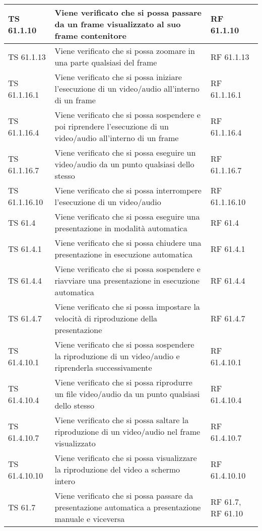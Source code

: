 {{\begin{longtable} [c]{| p{3cm} | p{6cm} |p{3cm}|}
			\hline
			TS 61.1.10 & Viene verificato che si possa passare da un frame\ped{g} visualizzato al suo frame\ped{g} contenitore & RF 61.1.10\\
			\hline
			TS 61.1.13 & Viene verificato che si possa zoomare in una parte qualsiasi del frame\ped{g} & RF 61.1.13\\
			\hline
			TS 61.1.16.1 & Viene verificato che si possa iniziare l’esecuzione di un video/audio all'interno di un frame\ped{g} & RF 61.1.16.1\\
			\hline
			TS 61.1.16.4 & Viene verificato che si possa sospendere\ped{g} e poi riprendere l'esecuzione di un video/audio all'interno di un frame\ped{g} & RF 61.1.16.4\\
			\hline
			TS 61.1.16.7 & Viene verificato che si possa eseguire un video/audio da un punto qualsiasi dello stesso & RF 61.1.16.7\\
			\hline
			TS 61.1.16.10 & Viene verificato che si possa interrompere l'esecuzione di un video/audio & RF 61.1.16.10\\
			\hline
			TS 61.4 & Viene verificato che si possa eseguire una presentazione in modalità automatica & RF 61.4\\
			\hline
			TS 61.4.1 & Viene verificato che si possa chiudere una presentazione in esecuzione automatica & RF 61.4.1\\
			\hline
			TS 61.4.4 & Viene verificato che si possa sospendere\ped{g} e riavviare una presentazione in esecuzione automatica & RF 61.4.4\\
			\hline
			TS 61.4.7 & Viene verificato che si possa impostare la velocità di riproduzione della presentazione & RF 61.4.7\\
			\hline
			TS 61.4.10.1 & Viene verificato che si possa sospendere la riproduzione di un video/audio e riprenderla successivamente & RF 61.4.10.1\\
			\hline
			TS 61.4.10.4 & Viene verificato che si possa riprodurre un file video/audio da un punto qualsiasi dello stesso & RF 61.4.10.4\\
			\hline
			TS 61.4.10.7 & Viene verificato che si possa saltare la riproduzione di un video/audio nel frame\ped{g} visualizzato & RF 61.4.10.7\\
			\hline
			TS 61.4.10.10 & Viene verificato che si possa visualizzare la riproduzione del video a schermo intero & RF 61.4.10.10\\
			\hline
			TS 61.7 & Viene verificato che si possa passare da presentazione automatica a presentazione manuale e viceversa & RF 61.7, RF 61.10\\

\end{longtable}}}
